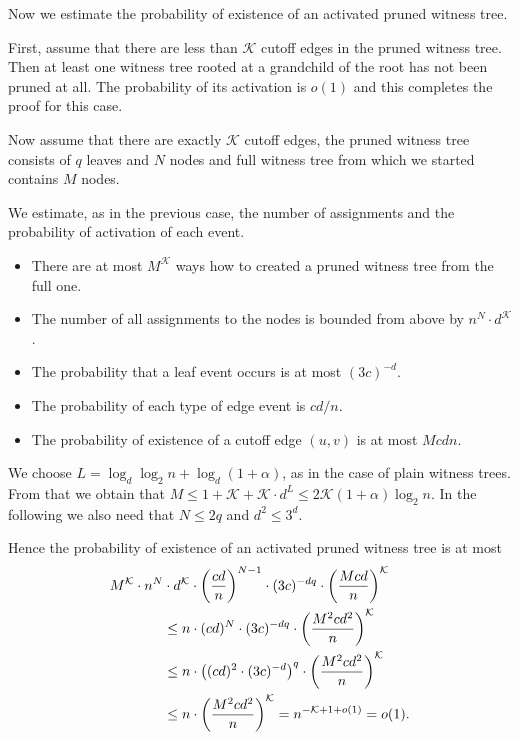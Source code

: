 Now we estimate the probability of existence of an activated pruned witness tree.

First, assume that there are less than $\mathcal{K}$ cutoff edges in the pruned witness tree.
Then at least one witness tree rooted at a grandchild of the root has not been pruned at all.
The probability of its activation is $o(1)$ and this completes the proof for this case.

Now assume that there are exactly $\mathcal{K}$ cutoff edges, the pruned witness tree consists of $q$ leaves and $N$ nodes and full witness tree from which we started contains $M$ nodes.

We estimate, as in the previous case, the number of assignments and the probability of activation of each event.
\begin{itemize}
	\item There are at most $M^{\mathcal{K}}$ ways how to created a pruned witness tree from the full one.
	\item The number of all assignments to the nodes is bounded from above by $n^N \cdot d^\mathcal{K}$.
	\item The probability that a leaf event occurs is at most $(3c)^{-d}$.
	\item The probability of each type of edge event is ${cd}/{n}$.
	\item The probability of existence of a cutoff edge $(u, v)$ is at most ${Mcd}{n}$.
\end{itemize}

We choose $L = \log_d \log_2 n + \log_d(1 + \alpha)$, as in the case of plain witness trees.
From that we obtain that $M \leq 1 + \mathcal{K} + \mathcal{K} \cdot d^L \leq 2\mathcal{K}(1+\alpha)\log_2 n$.
In the following we also need that $N \leq 2q$ and $d^2 \leq 3^d$. 

Hence the probability of existence of an activated pruned witness tree is at most
\[
\begin{split}
M^{\mathcal{K}} \cdot n^N & \cdot d^\mathcal{K} \cdot \left(\frac{cd}{n}\right)^{N - 1} \cdot (3c)^{-dq} \cdot \left(\frac{Mcd}{n}\right)^{\mathcal{K}} \\
	& \leq n \cdot (cd)^N \cdot (3c)^{-dq} \cdot \left(\frac{M^2 c d^2}{n}\right)^{\mathcal{K}} \\
	& \leq n \cdot \left((cd)^{2} \cdot (3c)^{-d}\right)^{q} \cdot \left(\frac{M^2 c d^2}{n}\right)^{\mathcal{K}} \\
	& \leq n \cdot \left(\frac{M^2 c d^2}{n}\right)^{\mathcal{K}} = n^{-\mathcal{K} + 1 + o(1)} = o(1). \\
\end{split}
\]

